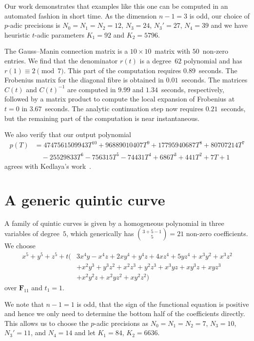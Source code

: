 Our work demonstrates that examples like this one can be computed in an 
automated fashion in short time.  As the dimension $n-1 = 3$ is odd, our 
choice of $p$-adic precisions is $N_0 = N_1 = N_2 = 12$, $N_3 = 24$, 
$N_3' = 27$, $N_4 = 39$ and we have heuristic $t$-adic parameters $K_1 = 92$ 
and $K_2 = 5796$.

The Gauss--Manin connection matrix is a $10 \times 10$~matrix with 
$50$~non-zero entries.  We find that the denominator $r(t)$ is a degree~$62$ 
polynomial and has $r(1) \equiv 2 \pmod{7}$.  This part of the computation 
requires $0.89$~seconds.  The Frobenius matrix for the diagonal fibre is 
obtained in $0.01$~seconds.  The matrices $C(t)$ and $C(t)^{-1}$ are 
computed in $9.99$ and $1.34$~seconds, respectively, followed by a matrix 
product to compute the local expansion of Frobenius at $t = 0$ in 
$3.67$~seconds.  The analytic continuation step now requires $0.21$~seconds, 
but the remaining part of the computation is near instantaneous.

We also verify that our output polynomial 
\begin{align*}
p(T) & = 4747561509943 T^{10}+96889010407 T^9+17795940687 T^8 +80707214 T^7 \\
& \quad -25529833 T^6 
-756315 T^5-74431 T^4+686 T^3+441 T^2+7 T+1
\end{align*}
agrees with Kedlaya's work~\citep[p.~20]{Kedlaya2011}.

\section{A generic quintic curve}

A family of quintic curves is given by a homogeneous polynomial 
in three variables of degree~$5$, which generically has 
$\binom{3+5-1}{5} = 21$ non-zero coefficients.  We choose 
\begin{equation*}
\begin{split}
x^5 + y^5 + z^5 + t \bigl( 
& 3 x^4 y - x^4 z + 2 x y^4 + y^4 z + 4 x z^4 + 5 y z^4 + x^3 y^2 + x^3 z^2 \\
& + x^2 y^3 + y^3 z^2 + x^2 z^3 + y^2 z^3 + x^3 y z + x y^3 z + x y z^3 \\
& + x^2 y^2 z + x^2 y z^2 + x y^2 z^2 \bigr)
\end{split}
\end{equation*}
over $\mathbf{F}_{11}$ and $t_1 = 1$.

We note that $n-1 = 1$ is odd, that the sign of the functional 
equation is positive and hence we only need to determine the 
bottom half of the coefficients directly.  This allows us to 
choose the $p$-adic precisions as $N_0 = N_1 = N_2 = 7$, 
$N_3 = 10$, $N_3' = 11$, and $N_4 = 14$ and let $K_1 = 84$, $K_2 = 6636$.

